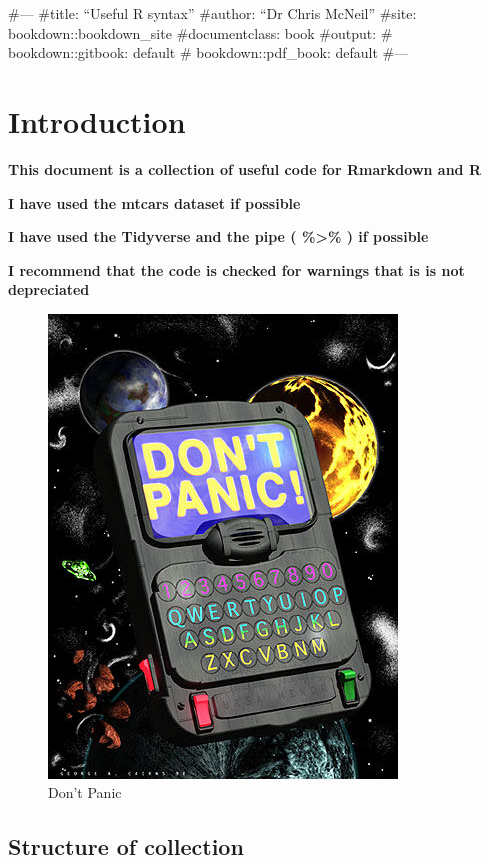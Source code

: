 \documentclass[
]{article}
\author{}
\date{\vspace{-2.5em}}
\begin{document}
{
\setcounter{tocdepth}{2}
\tableofcontents
}
\#---
\#title: ``Useful R syntax''
\#author: ``Dr Chris McNeil''
\#site: bookdown::bookdown\_site
\#documentclass: book
\#output:
\# bookdown::gitbook: default
\# bookdown::pdf\_book: default
\#---

\hypertarget{introduction}{%
\section{Introduction}\label{introduction}}

\textbf{This document is a collection of useful code for Rmarkdown and R}

\textbf{I have used the mtcars dataset if possible}

\textbf{I have used the Tidyverse and the pipe ( \%\textgreater\% ) if possible}

\textbf{I recommend that the code is checked for warnings that is is not depreciated}

\begin{figure}
\centering
\includegraphics{figures/guide.jpg}
\caption{Don't Panic}
\end{figure}

\hypertarget{structure-of-collection}{%
\subsection{Structure of collection}\label{structure-of-collection}}
\end{document}
